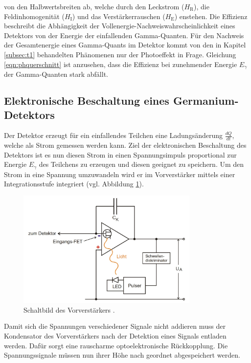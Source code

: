 von den Halbwertsbreiten ab, welche durch den Leckstrom ($H_\text{R}$), die Feldinhomogenität ($H_\text{I}$) und das Verstärkerrauschen ($H_\text{E}$) enstehen.
Die Effizienz beschreibt die Abhängigkeit der Vollenergie-Nachweiswahrscheinlichkeit eines Detektors von der Energie der einfallenden Gamma-Quanten.
Für den Nachweis der Gesamtenergie eines Gamma-Quants im Detektor kommt von den in Kapitel \ref{subsec:t1} behandelten Phänomenen nur der Photoeffekt in Frage.
Gleichung \eqref{eqn:phquerschnitt} ist anzusehen, dass die Effizienz bei zunehmender Energie $E_{\gamma}$ der Gamma-Quanten stark abfällt.

\subsection{Elektronische Beschaltung eines Germanium-Detektors}
\label{subsec:Elektronische Beschaltung eines Germanium-Detektors}
Der Detektor erzeugt für ein einfallendes Teilchen eine Ladungsänderung $\frac{dQ}{dt}$, welche als Strom gemessen werden kann.
Ziel der elektronischen Beschaltung des Detektors ist es nun diesen Strom in einen Spannungsimpuls proportional zur Energie $E_\gamma$ des Teilchens zu erzeugen und diesen geeignet zu speichern.
Um den Strom in eine Spannung umzuwandeln wird er im Vorverstärker mittels einer Integrationsstufe integriert (vgl. Abbildung \ref{fig:t:1}).
\begin{figure}
\centering
\includegraphics[width=0.8\textwidth]{content/skizzen/aufbau2.jpg}
\caption{Schaltbild des Vorverstärkers \cite{sample}.}
\label{fig:t:1}
\end{figure}
Damit sich die Spannungen verschiedener Signale nicht addieren muss der Kondensator des Vorverstärkers nach der Detektion eines Signals entladen werden.
Dafür sorgt eine rauscharme optoelektronische Rückkopplung.
Die Spannungssignale müssen nun ihrer Höhe nach geordnet abgespeichert werden.
